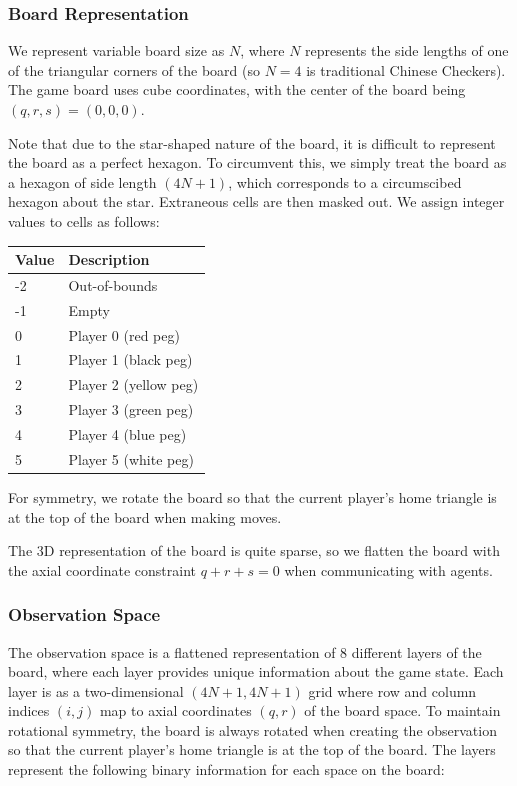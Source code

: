 \documentclass[12pt, a4paper, twocolumn]{article}
\begin{document}
\subsubsection{Board Representation}
We represent variable board size as $N$, where $N$ represents the side lengths of one of the triangular corners of the board (so $N=4$ is traditional Chinese Checkers). The game board uses cube coordinates, with the center of the board being $(q, r, s) = (0, 0, 0)$.

Note that due to the star-shaped nature of the board, it is difficult to represent the board as a perfect hexagon. To circumvent this, we simply treat the board as a hexagon of side length $(4N+1)$, which corresponds to a circumscibed hexagon about the star. Extraneous cells are then masked out. We assign integer values to cells as follows:

\begin{center}
  \begin{tabular}{|m{}|m{}|}
    \hline
    Value & Description \\
    \hline
    -2 & Out-of-bounds \\
    -1 & Empty \\
    0 & Player 0 (red peg) \\
    1 & Player 1 (black peg) \\
    2 & Player 2 (yellow peg) \\
    3 & Player 3 (green peg) \\
    4 & Player 4 (blue peg) \\
    5 & Player 5 (white peg) \\
    \hline
  \end{tabular}
  \end{center}

For symmetry, we rotate the board so that the current player's home triangle is at the top of the board when making moves. 
  
The 3D representation of the board is quite sparse, so we flatten the board with the axial coordinate constraint $q + r + s = 0$ when communicating with agents.

\subsubsection{Observation Space}

The observation space is a flattened representation of 8 different layers of the board, where each layer provides unique information about the game state. Each layer is as a two-dimensional $(4N + 1, 4N + 1)$ grid where row and column indices $(i, j)$ map to axial coordinates $(q, r)$ of the board space. To maintain rotational symmetry, the board is always rotated when creating the observation so that the current player's home triangle is at the top of the board. The layers represent the following binary information for each space on the board:
\end{document}
